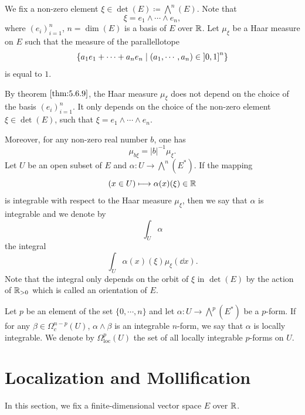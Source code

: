 \begin{definitionenv}
    We fix a non-zero element $\xi \in \det(E) \coloneq \bigwedge^n (E)$.
    Note that 
    $$\xi = e_1 \wedge \cdots \wedge e_n,$$
    where $(e_i)_{i=1}^{n}$, $n = \dim(E)$ is a basis of $E$ over $\mathbb{R}$.
    Let $\mu_{\xi}$ be a Haar measure on $E$ such that the measure of the parallellotope
    $$\{a_1 e_1 + \cdots + a_n e_n \mid (a_1,\cdots,a_n) \in \interval[open left]{0}{1}^n\}$$
    is equal to $1$.

    \quad By theorem $\ref{thm:5.6.9}$, the Haar measure $\mu_{\xi}$ does not depend on the choice of the basis $(e_i)_{i=1}^{n}$.
    It only depends on the choice of the non-zero element $\xi \in \det(E)$,
    such that $\xi = e_1 \wedge \cdots \wedge e_n$. 

    \quad Moreover, for any non-zero real number $b$, one has
    $$\mu_{b \xi} = |b|^{-1} \mu_{\xi}.$$
    Let $U$ be an open subset of $E$ and $\alpha : U \longrightarrow \bigwedge^n(E^*)$.
    If the mapping
    $$(x \in U) \longmapsto \alpha(x)(\xi) \in \mathbb{R}$$
    is integrable with respect to the Haar measure $\mu_{\xi}$,
    then we say that $\alpha$ is integrable and we denote by 
    $$\int_{U} \alpha$$
    the integral
    $$\int_{U} \alpha(x) (\xi) \mu_{\xi}(\dd x).$$
    Note that the integral only depends on the orbit of $\xi$ in $\det(E)$ by the action of $\mathbb{R}_{>0}$ which is called an orientation of $E$.

    \quad Let $p$ be an element of the set $\{0,\cdots,n\}$ and let $\alpha : U \rightarrow \bigwedge^p(E^*)$ be a $p$-form.
    If for any $\beta \in \Omega_{c}^{n-p}(U)$, $\alpha \wedge \beta$ is an integrable $n$-form, we say that $\alpha$ is locally integrable.
    We denote by $\Omega_{\text{loc}}^{p}(U)$ the set of all locally integrable $p$-forms on $U$.
\end{definitionenv}


\section{Localization and Mollification}


In this section, we fix a finite-dimensional vector space $E$ over $\mathbb{R}$.

